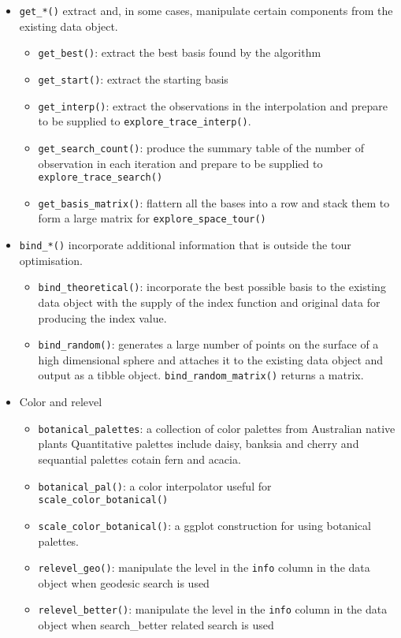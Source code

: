 \documentclass[12pt]{article}
\providecommand{\tightlist}{%
  \setlength{\itemsep}{0pt}\setlength{\parskip}{0pt}}
\begin{document}
\begin{itemize}
\item
  \texttt{get\_*()} extract and, in some cases, manipulate certain components from the existing data object.

  \begin{itemize}
  \tightlist
  \item
    \texttt{get\_best()}: extract the best basis found by the algorithm
  \item
    \texttt{get\_start()}: extract the starting basis
  \item
    \texttt{get\_interp()}: extract the observations in the interpolation and prepare to be supplied to \texttt{explore\_trace\_interp()}.
  \item
    \texttt{get\_search\_count()}: produce the summary table of the number of observation in each iteration and prepare to be supplied to \texttt{explore\_trace\_search()}
  \item
    \texttt{get\_basis\_matrix()}: flattern all the bases into a row and stack them to form a large matrix for \texttt{explore\_space\_tour()}
  \end{itemize}
\item
  \texttt{bind\_*()} incorporate additional information that is outside the tour optimisation.

  \begin{itemize}
  \tightlist
  \item
    \texttt{bind\_theoretical()}: incorporate the best possible basis to the existing data object with the supply of the index function and original data for producing the index value.
  \item
    \texttt{bind\_random()}: generates a large number of points on the surface of a high dimensional sphere and attaches it to the existing data object and output as a tibble object. \texttt{bind\_random\_matrix()} returns a matrix.
  \end{itemize}
\item
  Color and relevel

  \begin{itemize}
  \tightlist
  \item
    \texttt{botanical\_palettes}: a collection of color palettes from Australian native plants Quantitative palettes include daisy, banksia and cherry and sequantial palettes cotain fern and acacia.
  \item
    \texttt{botanical\_pal()}: a color interpolator useful for \texttt{scale\_color\_botanical()}
  \item
    \texttt{scale\_color\_botanical()}: a ggplot construction for using botanical palettes.
  \item
    \texttt{relevel\_geo()}: manipulate the level in the \texttt{info} column in the data object when geodesic search is used
  \item
    \texttt{relevel\_better()}: manipulate the level in the \texttt{info} column in the data object when search\_better related search is used
  \end{itemize}
\end{itemize}
\end{document}
